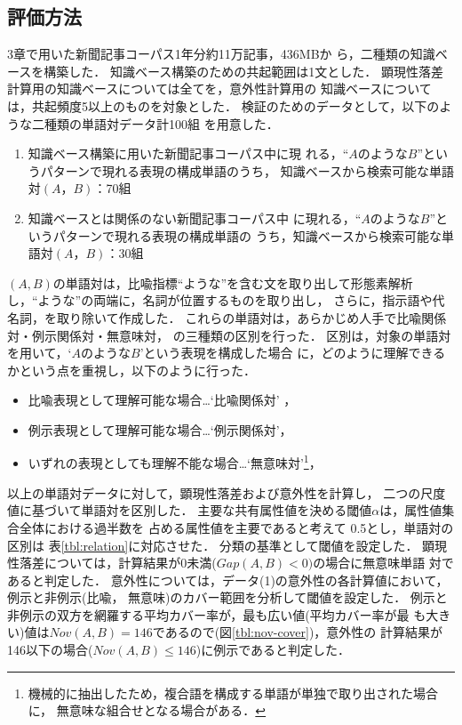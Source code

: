 \subsection{評価方法}
3章で用いた新聞記事コーパス1年分約11万記事，436MB\cite{Mainichi1995j}か
ら，二種類の知識ベースを構築した．
知識ベース構築のための共起範囲は1文とした．
顕現性落差計算用の知識ベースについては全てを，意外性計算用の
知識ベースについては，共起頻度5以上のものを対象とした．
検証のためのデータとして，以下のような二種類の単語対データ計100組
を用意した．
\begin{enumerate}
\item[データ(1)]
	知識ベース構築に用いた新聞記事コーパス\cite{Mainichi1995j}中に現
	れる，``$AのようなB$''というパターンで現れる表現の構成単語のうち，
	知識ベースから検索可能な単語対$(A，B)$：70組
\item[データ(2)]
	知識ベースとは関係のない新聞記事コーパス\cite{Mainichi1998ja}中
	に現れる，``$AのようなB$''というパターンで現れる表現の構成単語の
	うち，知識ベースから検索可能な単語対$(A，B)$：30組
\end{enumerate}
$(A,B)$の単語対は，比喩指標``ような''を含む文を取り出して形態素解析
\cite{Chasen1999j}し，``ような''の両端に，名詞が位置するものを取り出し，
さらに，指示語や代名詞，を取り除いて作成した．
これらの単語対は，あらかじめ人手で比喩関係対・例示関係対・無意味対，
の三種類の区別を行った．
区別は，対象の単語対を用いて，`$AのようなB$'という表現を構成した場合
に，どのように理解できるかという点を重視し，以下のように行った．
\begin{itemize}
\item[(a)] 比喩表現として理解可能な場合…`比喩関係対' ，
\item[(b)] 例示表現として理解可能な場合…`例示関係対'， 
\item[(c)] いずれの表現としても理解不能な場合…`無意味対'\footnote{
機械的に抽出したため，複合語を構成する単語が単独で取り出された場合に，
無意味な組合せとなる場合がある．}， 
\end{itemize}

以上の単語対データに対して，顕現性落差および意外性を計算し，
二つの尺度値に基づいて単語対を区別した．
主要な共有属性値を決める閾値$\alpha$は，属性値集合全体における過半数を
占める属性値を主要であると考えて 0.5とし，単語対の区別は
表\ref{tbl:relation}に対応させた．
分類の基準として閾値を設定した．
顕現性落差については，計算結果が0未満($Gap(A,B) < 0)$の場合に無意味単語
対であると判定した．
意外性については，データ(1)の意外性の各計算値において，例示と非例示(比喩，
無意味)のカバー範囲を分析して閾値を設定した．
例示と非例示の双方を網羅する平均カバー率が，最も広い値(平均カバー率が最
も大きい)値は$Nov(A,B)=146$であるので(図\ref{tbl:nov-cover})，意外性の
計算結果が146以下の場合($Nov(A,B) {\leq} 146$)に例示であると判定した．

